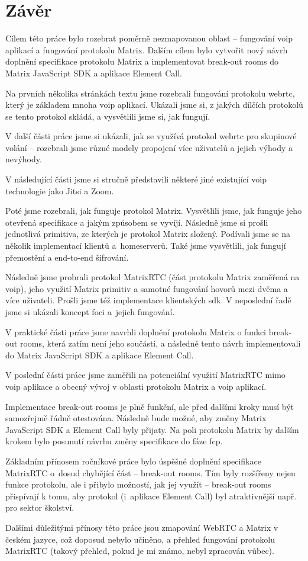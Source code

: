 \section{Závěr}

Cílem této práce bylo rozebrat poměrně nezmapovanou oblast -- fungování
\gls{voip} aplikací a fungování protokolu Matrix. Dalším cílem bylo vytvořit
nový návrh doplnění specifikace protokolu Matrix a implementovat break-out rooms
do Matrix JavaScript SDK a aplikace Element Call.

Na prvních několika stránkách textu jsme rozebrali fungování protokolu
\gls{webrtc}, který je základem mnoha \gls{voip} aplikací. Ukázali jsme si, z
jakých dílčích protokolů se tento protokol skládá, a vysvětlili jsme si, jak
fungují.

V další části práce jsme si ukázali, jak se využívá protokol \gls{webrtc} pro
skupinové volání -- rozebrali jsme různé modely propojení více uživatelů a
jejich výhody a nevýhody.

V následující části jsme si stručně představili některé jiné existující
\gls{voip} technologie jako Jitsi a Zoom.

Poté jsme rozebrali, jak funguje protokol Matrix. Vysvětlili jsme, jak funguje
jeho otevřená specifikace a jakým způsobem se vyvíjí. Následně jsme si prošli
jednotlivá primitiva, ze kterých je protokol Matrix složený. Podívali jsme se na
několik implementací klientů a~homeserverů. Také jsme vysvětlili, jak fungují
přemostění a end-to-end šifrování.

Následně jsme probrali protokol MatrixRTC (část protokolu Matrix zaměřená na
\gls{voip}), jeho využití Matrix primitiv a samotné fungování hovorů mezi dvěma
a více uživateli. Prošli jsme též implementace klientských \gls{sdk}. V
neposlední řadě jsme si ukázali koncept foci a~jejich fungování.

V praktické části práce jsme navrhli doplnění protokolu Matrix o funkci
break-out rooms, která zatím není jeho součástí, a následně tento návrh
implementovali do Matrix JavaScript SDK a aplikace Element Call.

V poslední části práce jsme zaměřili na potenciální využití MatrixRTC mimo
\gls{voip} aplikace a obecný vývoj v oblasti protokolu Matrix a \gls{voip}
aplikací.

Implementace break-out rooms je plně funkční, ale před dalšími kroky musí být
samozřejmě řádně otestována. Následně bude možné, aby změny Matrix JavaScript
SDK a Element Call byly přijaty. Na poli protokolu Matrix by dalším krokem bylo
posunutí návrhu změny specifikace do fáze \gls{fcp}.

Základním přínosem ročníkové práce bylo úspěšné doplnění specifikace MatrixRTC
o~dosud chybějící část -- break-out rooms. Tím byly rozšířeny nejen funkce
protokolu, ale i přibylo možností, jak jej využít -- break-out rooms přispívají
k tomu, aby protokol (i~aplikace Element Call) byl atraktivnější např. pro
sektor školství.

Dalšími důležitými přínosy této práce jsou zmapování WebRTC a Matrix v českém
jazyce, což doposud nebylo učiněno, a přehled fungování protokolu MatrixRTC
(takový přehled, pokud je mi známo, nebyl zpracován vůbec).
